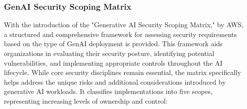 
\subsubsection{GenAI Security Scoping Matrix} %
\label{sec: GenAI Security Scoping Matrix}

With the introduction of the "Generative AI Security Scoping Matrix," by AWS, a structured and comprehensive framework for assessing security requirements based on the type of GenAI deployment is provided\cite{noauthor_securing_nodate}. This framework aids organizations in evaluating their security posture, identifying potential vulnerabilities, and implementing appropriate controls throughout the AI lifecycle\cite{noauthor_securing_nodate}. While core security disciplines remain essential, the matrix specifically helps address the unique risks and additional considerations introduced by generative AI workloads\cite{noauthor_securing_nodate}. It classifies implementations into five scopes, representing increasing levels of ownership and control\cite{noauthor_securing_2023}:

